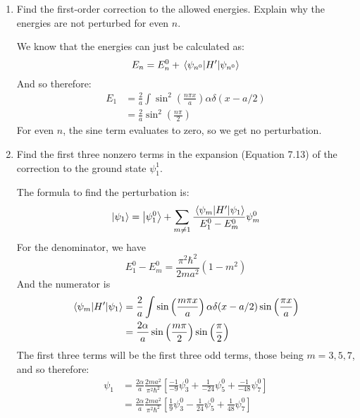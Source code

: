 \documentclass[10pt]{article}
\begin{document}
    \begin{enumerate}[label=(\alph*)]
        \item Find the first-order correction to the allowed energies. Explain why the energies are not perturbed for even $n$.
        
        \begin{solution}
            We know that the energies can just be calculated as:
            \[ E_n = E_n^0 + \expval{H'}{\psi_{n^0}}\]
            And so therefore: 
            \begin{align*}
                E_1 &= \frac{2}{a} \int \sin^2 \left(\frac{n \pi x}{a}\right) \alpha \delta(x - a/2) \\
                &= \frac{2}{a} \sin^2 \left( \frac{n\pi}{2}\right)
            \end{align*}
            For even $n$, the sine term evaluates to zero, so we get no perturbation.
        \end{solution}
        \item Find the first three nonzero terms in the expansion (Equation 7.13) of the correction to the ground state $\psi_1^1$.
        
        \begin{solution}
            The formula to find the perturbation is: 
            \[ \ket{\psi_1} = \ket{\psi_1^0} + \sum_{m \neq 1} \frac{\mel{\psi_m}{H'}{\psi_1}}{E_1^0 - E_m^0} \psi_m^0\]
            For the denominator, we have
            \[ E_1^0 - E_m^0 = \frac{\pi^2 \hbar^2}{2ma^2}(1 - m^2)\]
            And the numerator is 
            \begin{align*}
                \mel{\psi_m}{H'}{\psi_1} &= \frac{2}{a} \int \sin\left( \frac{m \pi x}{a}\right) \alpha \delta(x - a/2) \sin \left( \frac{\pi x}{a}\right)\\
                &= \frac{2\alpha}{a} \sin \left( \frac{m\pi}{2}\right) \sin\left( \frac{\pi}{2}\right)
            \end{align*}
            The first three terms will be the first three odd terms, those being $m = 3, 5, 7$, and so therefore: 
            \begin{align*}
                \psi_1 &= \frac{2\alpha}{a} \frac{2ma^2}{\pi^2 \hbar^2}\left[ \frac{-1}{-9} \psi_3^0 + \frac{1}{-24} \psi_5^0 + \frac{-1}{-48} \psi_7^0\right]\\
                &= \frac{2\alpha}{a} \frac{2ma^2}{\pi^2 \hbar^2}\left[ \frac 19 \psi_3^0 - \frac{1}{24} \psi_5^0 + \frac{1}{48} \psi_7^0\right]
            \end{align*}
        \end{solution}
    \end{enumerate}
\end{document}
